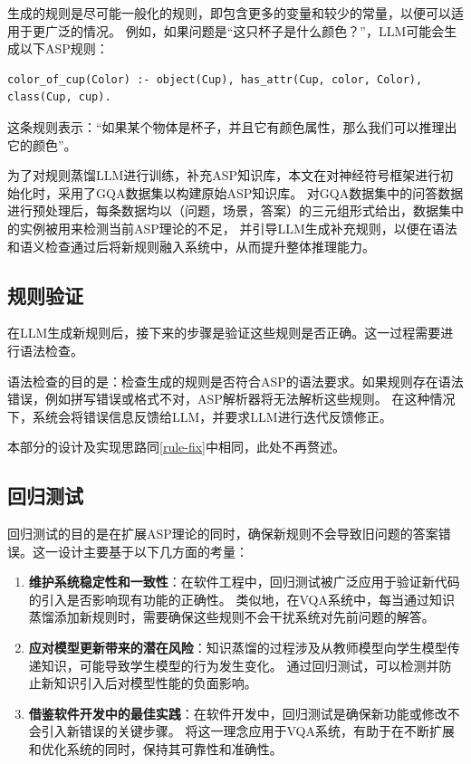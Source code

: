 生成的规则是尽可能一般化的规则，即包含更多的变量和较少的常量，以便可以适用于更广泛的情况。
例如，如果问题是“这只杯子是什么颜色？”，LLM可能会生成以下ASP规则：
\begin{lstlisting}
color_of_cup(Color) :- object(Cup), has_attr(Cup, color, Color), class(Cup, cup).
\end{lstlisting}
这条规则表示：“如果某个物体是杯子，并且它有颜色属性，那么我们可以推理出它的颜色”。

为了对规则蒸馏LLM进行训练，补充ASP知识库，本文在对神经符号框架进行初始化时，采用了GQA数据集以构建原始ASP知识库。
对GQA数据集中的问答数据进行预处理后，每条数据均以（问题，场景，答案）的三元组形式给出，数据集中的实例被用来检测当前ASP理论的不足，
并引导LLM生成补充规则，以便在语法和语义检查通过后将新规则融入系统中，从而提升整体推理能力。 
\subsection{规则验证}
在LLM生成新规则后，接下来的步骤是验证这些规则是否正确。这一过程需要进行语法检查。

语法检查的目的是：检查生成的规则是否符合ASP的语法要求。如果规则存在语法错误，例如拼写错误或格式不对，ASP解析器将无法解析这些规则。
在这种情况下，系统会将错误信息反馈给LLM，并要求LLM进行迭代反馈修正。

本部分的设计及实现思路同\ref{rule-fix}中相同，此处不再赘述。
\subsection{回归测试}
回归测试的目的是在扩展ASP理论的同时，确保新规则不会导致旧问题的答案错误。这一设计主要基于以下几方面的考量：
\begin{enumerate}[itemsep=0pt,parsep=0pt]
\item \textbf{维护系统稳定性和一致性}：​在软件工程中，回归测试被广泛应用于验证新代码的引入是否影响现有功能的正确性。
类似地，在VQA系统中，每当通过知识蒸馏添加新规则时，需要确保这些规则不会干扰系统对先前问题的解答。
\item \textbf{应对模型更新带来的潜在风险}：​知识蒸馏的过程涉及从教师模型向学生模型传递知识，可能导致学生模型的行为发生变化。
通过回归测试，可以检测并防止新知识引入后对模型性能的负面影响。
\item \textbf{借鉴软件开发中的最佳实践}：​在软件开发中，回归测试是确保新功能或修改不会引入新错误的关键步骤。
将这一理念应用于VQA系统，有助于在不断扩展和优化系统的同时，保持其可靠性和准确性。
\end{enumerate}

